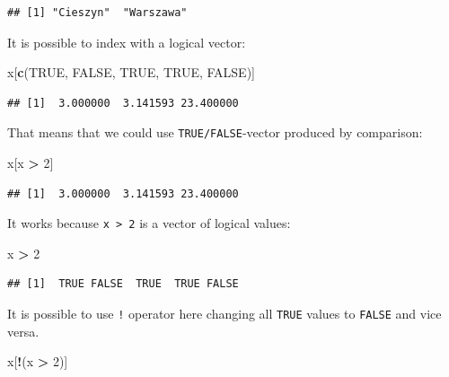 \documentclass[
]{book}
\newenvironment{Shaded}{\begin{snugshade}}{\end{snugshade}}
\newcommand{\DecValTok}[1]{\textcolor[rgb]{0.00,0.00,0.81}{#1}}
\newcommand{\KeywordTok}[1]{\textcolor[rgb]{0.13,0.29,0.53}{\textbf{#1}}}
\newcommand{\NormalTok}[1]{#1}
\newcommand{\OperatorTok}[1]{\textcolor[rgb]{0.81,0.36,0.00}{\textbf{#1}}}
\newcommand{\OtherTok}[1]{\textcolor[rgb]{0.56,0.35,0.01}{#1}}
\newcommand{\StringTok}[1]{\textcolor[rgb]{0.31,0.60,0.02}{#1}}
\begin{document}
\begin{verbatim}
## [1] "Cieszyn"  "Warszawa"
\end{verbatim}

It is possible to index with a logical vector:

\begin{Shaded}
\begin{Highlighting}[]
\NormalTok{x[}\KeywordTok{c}\NormalTok{(}\OtherTok{TRUE}\NormalTok{, }\OtherTok{FALSE}\NormalTok{, }\OtherTok{TRUE}\NormalTok{, }\OtherTok{TRUE}\NormalTok{, }\OtherTok{FALSE}\NormalTok{)]}
\end{Highlighting}
\end{Shaded}

\begin{verbatim}
## [1]  3.000000  3.141593 23.400000
\end{verbatim}

That means that we could use \texttt{TRUE/FALSE}-vector produced by comparison:

\begin{Shaded}
\begin{Highlighting}[]
\NormalTok{x[x }\OperatorTok{>}\StringTok{ }\DecValTok{2}\NormalTok{]}
\end{Highlighting}
\end{Shaded}

\begin{verbatim}
## [1]  3.000000  3.141593 23.400000
\end{verbatim}

It works because \texttt{x\ \textgreater{}\ 2} is a vector of logical values:

\begin{Shaded}
\begin{Highlighting}[]
\NormalTok{x }\OperatorTok{>}\StringTok{ }\DecValTok{2}
\end{Highlighting}
\end{Shaded}

\begin{verbatim}
## [1]  TRUE FALSE  TRUE  TRUE FALSE
\end{verbatim}

It is possible to use \texttt{!} operator here changing all \texttt{TRUE} values to \texttt{FALSE} and vice versa.

\begin{Shaded}
\begin{Highlighting}[]
\NormalTok{x[}\OperatorTok{!}\NormalTok{(x }\OperatorTok{>}\StringTok{ }\DecValTok{2}\NormalTok{)]}
\end{Highlighting}
\end{Shaded}
\end{document}
